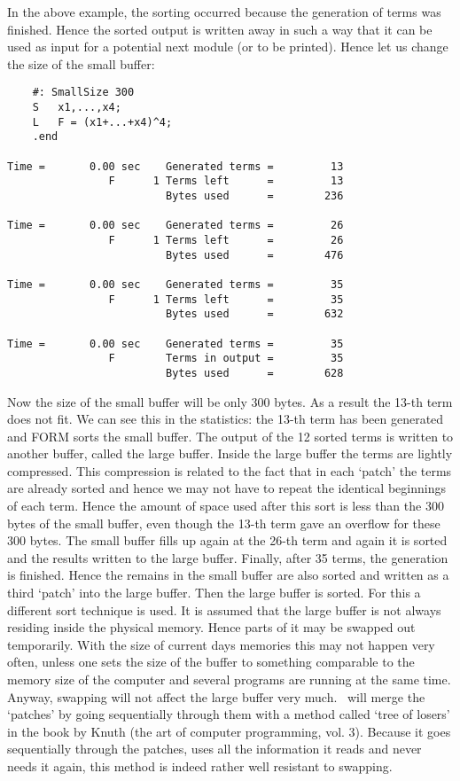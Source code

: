 In the above example, the sorting occurred because the generation of terms 
was finished. Hence the sorted output is written away in such a way that it 
can be used as input for a potential next module (or to be printed). 
Hence let us change the size of the small buffer:
\begin{verbatim}
    #: SmallSize 300
    S	x1,...,x4;
    L	F = (x1+...+x4)^4;
    .end

Time =       0.00 sec    Generated terms =         13
                F      1 Terms left      =         13
                         Bytes used      =        236

Time =       0.00 sec    Generated terms =         26
                F      1 Terms left      =         26
                         Bytes used      =        476

Time =       0.00 sec    Generated terms =         35
                F      1 Terms left      =         35
                         Bytes used      =        632

Time =       0.00 sec    Generated terms =         35
                F        Terms in output =         35
                         Bytes used      =        628
\end{verbatim}
Now the size of the small buffer will be only 300 bytes. As a result the 
13-th term does not fit. We can see this in the statistics: the 13-th term 
has been generated and FORM sorts the small buffer. The output of the 12 
sorted terms is written to another buffer, called the
large buffer. Inside the large 
buffer the terms are lightly compressed. This compression is related to the 
fact that in each `patch' the terms are already sorted and 
hence we may not have to repeat the identical beginnings of each term. 
Hence the amount of space used after this sort is less than the 300 bytes 
of the small buffer, even though the 13-th term gave an overflow for these 
300 bytes. The small buffer fills up again at the 26-th term and again it 
is sorted and the results written to the large buffer. Finally, after 35 
terms, the generation is finished. Hence the remains in the small buffer 
are also sorted and written as a third `patch' into the large buffer. Then 
the large buffer is sorted. For this a different sort technique is used. It 
is assumed that the large buffer is not always residing inside the physical 
memory. Hence parts of it may be swapped out temporarily. With the size of 
current days memories this may not happen very often, unless one sets the 
size of the buffer to something comparable to the memory size of the 
computer and several programs are running at the same time. Anyway, 
swapping will not affect the large buffer very much. \FORM\ will merge the 
`patches' by going sequentially through them with a method called 
`tree of losers' in the book by Knuth 
(the art of computer programming, vol. 3). Because it goes sequentially 
through the patches, uses all the information it reads and never needs it 
again, this method is indeed rather well resistant to swapping.

